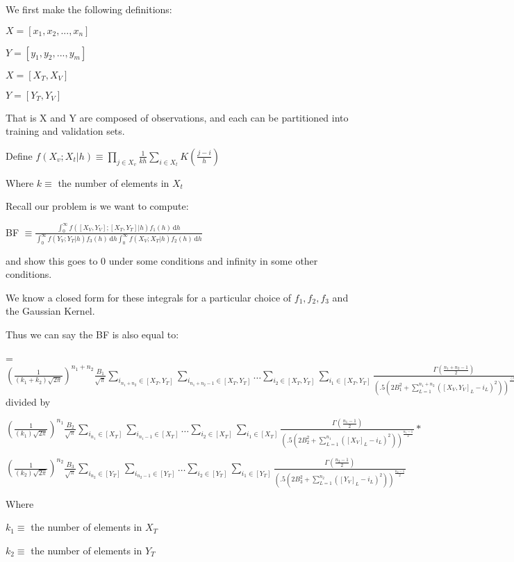 \documentclass[11pt]{article}
\begin{document}
We first make the following definitions:

$X = [x_1,x_2,...,x_n]$

$Y = [y_1,y_2,...,y_m]$

$X = [X_T,X_V]$

$Y = [Y_T,Y_V]$

That is X and Y are composed of observations, and each can be partitioned into training and validation sets.

Define $f(X_v; X_t |h) \equiv \prod_{j \in X_v} \frac{1}{kh} \sum_{i \in X_t} K(\frac{j-i}{h})$

Where $k \equiv $ the number of elements in $X_t$

Recall our problem is we want to compute:

BF  $\equiv \frac{\int_0^\infty \! f([X_V,Y_V];[ X_T,Y_T] |h) f_1(h)\, \mathrm{d}h}{\int_0^\infty \! f(Y_V; Y_T|h) f_3(h)\, \mathrm{d}h \int_0^\infty \! f(X_V; X_T|h) f_2(h)\, \mathrm{d}h}$

and show this goes to 0 under some conditions and infinity in some other conditions.

We know a closed form for these integrals for a particular choice of $f_1, f_2, f_3$ and the Gaussian Kernel.

Thus we can say the BF is also equal to:

= $(\frac{1}{(k_1 + k_2)\sqrt{2\pi}})^{n_1+n_2} \frac{B_1}{\sqrt{\pi}}  \sum_{i_{n_1+n_2} \in [X_T, Y_T]} \sum_{i_{n_1+n_2-1}\in [X_T, Y_T]} \ldots  \sum_{i_{2}\in [X_T, Y_T]} \sum_{i_{1}\in [X_T, Y_T]} \frac{ \Gamma (\frac{n_1 + n_2 -1}{2})}{(.5(2B_1^2 +  \sum_{L=1}^{n_1+n_2} ([X_V, Y_V]_{L} - i_L)^2))^{\frac{(n_1+n_2)-1}{2}}} $ divided by

$(\frac{1}{(k_1)\sqrt{2\pi}})^{n_1} \frac{B_2}{\sqrt{\pi}}  \sum_{i_{n_1} \in [X_T]} \sum_{i_{n_1-1}\in [X_T]} \ldots  \sum_{i_{2}\in [X_T]} \sum_{i_{1}\in [X_T]} \frac{ \Gamma (\frac{n_1-1}{2})}{(.5(2B_2^2 +  \sum_{L=1}^{{n_1}} ([X_V]_{L} - i_L)^2))^{\frac{{n_1}-1}{2}}}  * $


$ (\frac{1}{(k_2)\sqrt{2\pi}})^{n_2} \frac{B_3}{\sqrt{\pi}}  \sum_{i_{n_2} \in [Y_T]} \sum_{i_{n_2-1}\in [Y_T]} \ldots  \sum_{i_{2}\in [Y_T]} \sum_{i_{1}\in [Y_T]} \frac{ \Gamma (\frac{n_2-1}{2})}{(.5(2B_3^2 +  \sum_{L=1}^{n_2} ([Y_V]_{L} - i_L)^2))^{\frac{n_2-1}{2}}} $

Where 

$k_1 \equiv $ the number of elements in $X_T$

$k_2 \equiv $ the number of elements in $Y_T$
\end{document}
